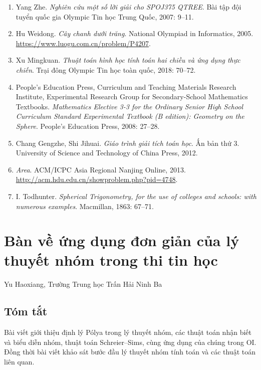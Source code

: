 \documentclass[11pt]{article}
\begin{document}
\begin{enumerate}
  \item Yang Zhe. \emph{Nghiên cứu một số lời giải cho SPOJ375 QTREE}. Bài tập
  đội tuyển quốc gia Olympic Tin học Trung Quốc, 2007: 9--11.
  \item Hu Weidong. \emph{Cây chanh dưới trăng}. National Olympiad in
  Informatics, 2005. \url{https://www.luogu.com.cn/problem/P4207}.
  \item Xu Mingkuan. \emph{Thuật toán hình học tính toán hai chiều và ứng dụng
  thực chiến}. Trại đông Olympic Tin học toàn quốc, 2018: 70--72.
  \item People's Education Press, Curriculum and Teaching Materials Research
  Institute, Experimental Research Group for Secondary-School Mathematics
  Textbooks. \emph{Mathematics Elective 3-3 for the Ordinary Senior High School
  Curriculum Standard Experimental Textbook (B edition): Geometry on the
  Sphere}. People's Education Press, 2008: 27--28.
  \item Chang Gengzhe, Shi Jihuai. \emph{Giáo trình giải tích toán học}. Ấn bản
  thứ 3. University of Science and Technology of China Press, 2012.
  \item \emph{Area}. ACM/ICPC Asia Regional Nanjing Online, 2013.
  \url{http://acm.hdu.edu.cn/showproblem.php?pid=4748}.
  \item I. Todhunter. \emph{Spherical Trigonometry, for the use of colleges and
  schools: with numerous examples}. Macmillan, 1863: 67--71.
\end{enumerate}

\section{Bàn về ứng dụng đơn giản của lý thuyết nhóm trong thi tin học}

\begin{center}
Yu Haoxiang, Trường Trung học Trấn Hải Ninh Ba
\end{center}

\subsection*{Tóm tắt}

Bài viết giới thiệu định lý Pólya trong lý thuyết nhóm, các thuật toán nhận
biết và biểu diễn nhóm, thuật toán Schreier--Sims, cùng ứng dụng của chúng
trong OI. Đồng thời bài viết khảo sát bước đầu lý thuyết nhóm tính toán và các
thuật toán liên quan.
\end{document}
